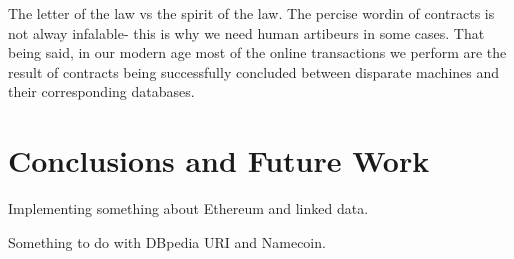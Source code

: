 \documentclass[runningheads,a4paper]{llncs}
\begin{document}
The letter of the law vs the spirit of the law. The percise wordin of contracts is not alway infalable- this is why we need human artibeurs in some cases. That being said, in our modern age most of the online transactions we perform are the result of contracts being successfully concluded between disparate machines and their corresponding databases. 

\section{Conclusions and Future Work}

Implementing something about Ethereum and linked data. 

Something to do with DBpedia URI and Namecoin. 




\end{document}

